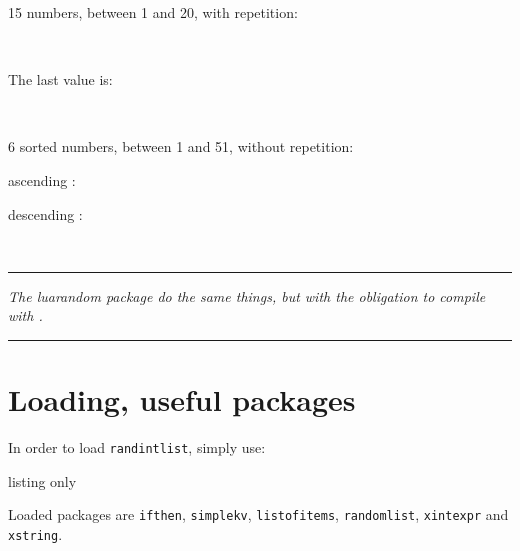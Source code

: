 \documentclass[11pt,a4paper]{ltxdoc}
\begin{document}
\begin{tcolorbox}[colframe=lightgray,colback=lightgray!5]
15 numbers, between 1 and 20, with repetition:

\hfill\randintlist[min=1,max=20,nb=15,repeat]{\mylist}\textcolor{red}{\mylist}\hfill~

The last value is:

\hfill\textcolor{blue}{}\hfill~
\end{tcolorbox}

\begin{tcolorbox}[colframe=lightgray,colback=lightgray!5]
6 sorted numbers, between 1 and 51, without repetition:

\hfill\randintlist[min=1,max=51,nb=6,sort=asc]{\mylist}ascending : \textcolor{red}{\mylist}\hfill~

\hfill\randintlist[min=1,max=51,nb=6,sort=des,sep=>]{\mylist}descending : \textcolor{red}{\mylist}\hfill~
\end{tcolorbox}

\vfill~

\hrule

\medskip

\emph{%
	The \textsf{luarandom} package do the same things, but with the obligation to compile with .
}

\medskip

\hrule

\vspace*{5mm}

\pagebreak


\hypertarget{matoc}{}

\tableofcontents

\vspace*{5mm}


\pagebreak

\section{Loading, useful packages}

In order to load \texttt{randintlist}, simply use:

\begin{DemoCode}{listing only}
\usepackage{randintlist}
\end{DemoCode}

Loaded packages are \texttt{ifthen}, \texttt{simplekv}, \texttt{listofitems}, \texttt{randomlist},  \texttt{xintexpr} and \texttt{xstring}.
\end{document}
